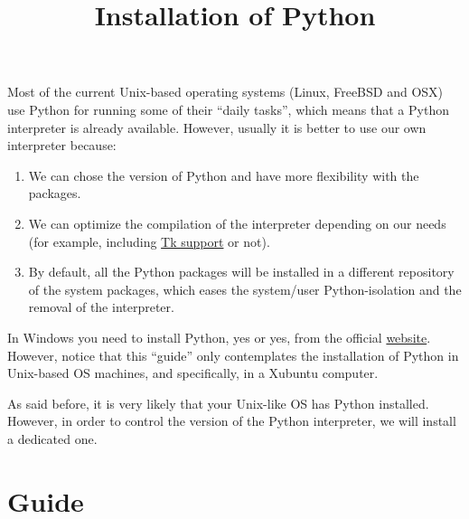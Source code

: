 \title{Installation of Python}

\maketitle

\tableofcontents

Most of the current Unix-based operating systems (Linux, FreeBSD and
OSX) use Python for running some of their ``daily tasks'', which means
that a Python interpreter is already available. However, usually it is
better to use our own interpreter because:

\begin{enumerate}

\item We can chose the version of Python and have more flexibility
  with the packages.

\item We can optimize the compilation of the interpreter depending on
  our needs (for example, including
  \href{https://wiki.python.org/moin/TkInter}{Tk support} or not).

\item By default, all the Python packages will be installed in a
  different repository of the system packages, which eases the
  system/user Python-isolation and the removal of the interpreter.

\end{enumerate}

In Windows you need to install Python, yes or yes, from the official
\href{https://www.python.org/downloads/}{website}. However, notice
that this ``guide'' only contemplates the installation of Python in
Unix-based OS machines, and specifically, in a Xubuntu computer.

As said before, it is very likely that your Unix-like OS has Python
installed. However, in order to control the version of the Python
interpreter, we will install a dedicated one.

\section{Guide}


